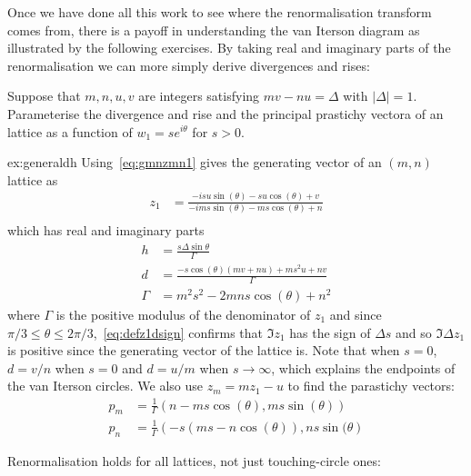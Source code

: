 Once we have done all this work to see where the renormalisation transform comes from, there is a payoff in understanding  the van Iterson diagram as illustrated by the following exercises. By taking real and imaginary parts of the renormalisation we can more simply derive divergences and rises:
\begin{jExercise}\label{ex:generaldh}
	Suppose that $m ,n ,u, v$ are integers satisfying  $m v - n u =\Delta $ with $|\Delta|=1$.  Parameterise the divergence and rise and the principal prastichy vectora of an   lattice as a function of $w_1=s e^{i\theta}$ for $s>0$. 

\end{jExercise}
\begin{jAnswer}{ex:generaldh}{
	Using~\eqref{eq:gmnzmn1} gives the generating vector of an $(m,n)$ lattice as 
			\begin{align}
			 z_1 &= \frac{-i s u \sin (\theta )-s u \cos (\theta )+v}{-i m s \sin (\theta )-m s \cos (\theta )+n}
			 \label{eq:base_z1} \\
			 \end{align}
which has real and imaginary parts
			\begin{align}
			h &= 
		\frac{s \Delta  \sin\theta}{\Gamma} \label{eq:defz1dsign} \\
			d &= \frac{-s \cos (\theta ) (m v+n u)+m s^2 u+n v}{\Gamma }
			\\
		\Gamma&=m^2 s^2-2 m n s \cos (\theta )+n^2
		\end{align}
		where $\Gamma$ is the positive modulus of the denominator of $z_1$ and since $\pi/3\leq\theta\leq2\pi/3$,~\eqref{eq:defz1dsign} confirms that $\Im z_1$ has the sign of $\Delta s$ and so $\Im \Delta z_1$ is positive since the generating vector of the  lattice is. 		
	}
Note that when $s=0$, $d=v/n$ when $s=0$ and $d=u/m$ when $s\rightarrow\infty$, which explains the endpoints of the van Iterson circles. We also use $z_m=m z_1-u$ to find the parastichy vectors:
	\begin{align}
	p_m &= \frac{1}{\Gamma}\left(n-m s \cos (\theta ),m s \sin (\theta ) \right) 
	\label{eq:base_pm}
	 \\
		p_n&= \frac{1}{\Gamma}\left(-s (m s-n \cos (\theta )),n s \sin (\theta \right) 
	\label{eq:base_pn} 
\end{align}

\end{jAnswer}

Renormalisation holds for all lattices, not just touching-circle ones:

